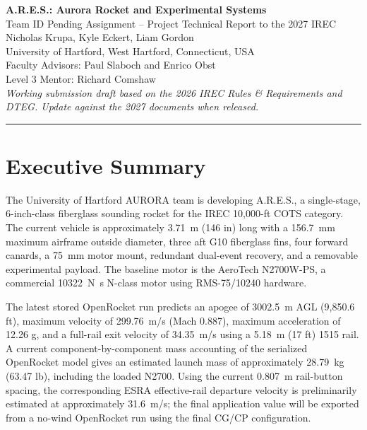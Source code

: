 \documentclass[10pt]{article}
\newcommand{\ARES}{A.R.E.S.}
\begin{document}
\begin{center}
{\LARGE\bfseries A.R.E.S.: Aurora Rocket and Experimental Systems}\\[4pt]
{\large Team ID Pending Assignment -- Project Technical Report to the 2027 IREC}\\[8pt]
Nicholas Krupa, Kyle Eckert, Liam Gordon\\
University of Hartford, West Hartford, Connecticut, USA\\
Faculty Advisors: Paul Slaboch and Enrico Obst\\
Level 3 Mentor: Richard Comshaw\\[4pt]
\textit{Working submission draft based on the 2026 IREC Rules \& Requirements and DTEG. Update against the 2027 documents when released.}
\end{center}

\vspace{0.08in}
\hrule
\vspace{0.12in}

\section*{Executive Summary}

The University of Hartford AURORA team is developing \ARES{}, a single-stage, 6-inch-class fiberglass sounding rocket for the IREC 10,000-ft COTS category. The current vehicle is approximately \SI{3.71}{m} (146 in) long with a \SI{156.7}{mm} maximum airframe outside diameter, three aft G10 fiberglass fins, four forward canards, a \SI{75}{mm} motor mount, redundant dual-event recovery, and a removable experimental payload. The baseline motor is the AeroTech N2700W-PS, a commercial \SI{10322}{N.s} N-class motor using RMS-75/10240 hardware.

The latest stored OpenRocket run predicts an apogee of \SI{3002.5}{m} AGL (9,850.6 ft), maximum velocity of \SI{299.76}{m/s} (Mach 0.887), maximum acceleration of 12.26 g, and a full-rail exit velocity of \SI{34.35}{m/s} using a \SI{5.18}{m} (17 ft) 1515 rail. A current component-by-component mass accounting of the serialized OpenRocket model gives an estimated launch mass of approximately \SI{28.79}{kg} (63.47 lb), including the loaded N2700. Using the current \SI{0.807}{m} rail-button spacing, the corresponding ESRA effective-rail departure velocity is preliminarily estimated at approximately \SI{31.6}{m/s}; the final application value will be exported from a no-wind OpenRocket run using the final CG/CP configuration.
\end{document}
